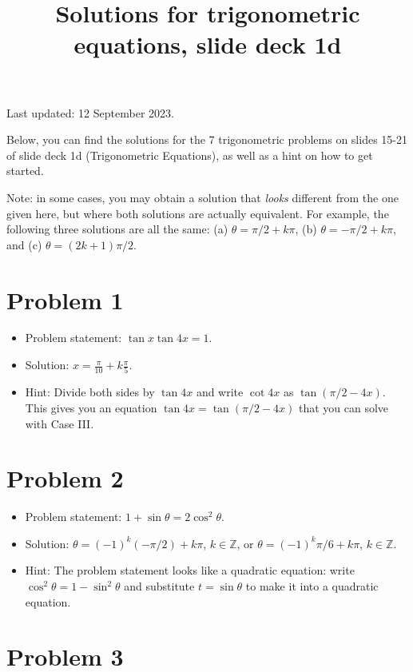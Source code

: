 \documentclass{amsart}
\title{Solutions for trigonometric equations, slide deck 1d}
\begin{document}
\maketitle

Last updated: 12 September 2023.

Below, you can find the solutions for the 7 trigonometric problems on slides
15-21 of slide deck 1d (Trigonometric Equations), as well as a hint on how to
get started.

Note: in some cases, you may obtain a solution that \emph{looks} different from the one given here, but where both solutions are actually equivalent. For example, the following three solutions are all the same: (a) $\theta = \pi/2 + k\pi$, (b) $\theta = - \pi/2 + k \pi$, and (c) $\theta = (2k + 1) \pi/2$.

\section*{Problem 1}

\begin{itemize}
  \item Problem statement: $\tan x \tan 4x = 1$.
  \item Solution: $x = \frac{\pi}{10} + k \frac{\pi}{5}$.
  \item Hint: Divide both sides by $\tan 4x$ and write $\cot 4x$ as $\tan \left( \pi/2 - 4x\right)$. This gives you an equation $\tan 4x = \tan (\pi/2 - 4x)$ that you can solve with Case III.
  \end{itemize}  

\section*{Problem 2}

\begin{itemize}
  \item Problem statement: $1 + \sin \theta = 2\cos^2\theta$.
  \item Solution: $\theta = (-1)^k (-\pi/2) + k \pi$, $k \in \mathbb{Z}$, or $\theta = (-1)^k \pi/6 + k \pi$, $k \in \mathbb{Z}$.
  \item Hint: The problem statement looks like a quadratic equation: write $\cos^2 \theta = 1 - \sin^2 \theta$ and substitute $t = \sin \theta$ to make it into a quadratic equation.
  \end{itemize}  

\section*{Problem 3}
\end{document}
